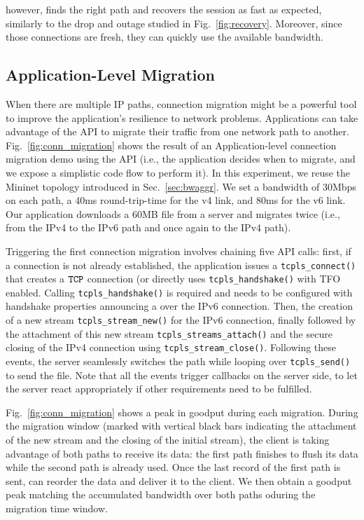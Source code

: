 \tcpls however, finds the right path and recovers the session as fast as
expected, similarly to the drop and \rst outage studied in Fig.~\ref{fig:recovery}. Moreover, since those connections are fresh, they can quickly use the available bandwidth.

\subsection{Application-Level Migration}

When there are multiple IP paths, connection migration might be a
powerful tool to improve the application's resilience to network problems. Applications can take advantage of the \tcpls API to migrate their traffic from one network path to another. Fig.~\ref{fig:conn_migration} shows the result of an Application-level connection migration demo using the API (i.e., the application decides when to migrate, and we expose a simplistic code flow to perform it). In this experiment, we reuse the Mininet topology introduced in Sec.~\ref{sec:bwaggr}. We set a bandwidth of 30Mbps on each path, a 40ms round-trip-time for the v4 link, and 80ms for the v6 link. Our application downloads
a 60MB file from a server and migrates twice (i.e., from the IPv4 to the IPv6 path and once again to the IPv4 path).

Triggering the first connection migration involves chaining five API calls: first, if a \tcp connection is not already established, the application issues a
\texttt{tcpls\_connect()} that creates a $\texttt{TCP}$ connection (or directly uses
\texttt{tcpls\_handshake()} with TFO enabled. Calling \texttt{tcpls\_handshake()} is required and needs to be configured with handshake properties announcing a \join over the IPv6 connection. Then, the creation of a new stream \texttt{tcpls\_stream\_new()} for the IPv6 connection, finally followed by the attachment of this new stream \texttt{tcpls\_streams\_attach()} and the secure closing of the IPv4 \tcp connection using \texttt{tcpls\_stream\_close()}. Following these events, the server seamlessly switches the path while looping over \texttt{tcpls\_send()} to send the file. Note that all the events trigger callbacks on the server side, to let the server react appropriately if other requirements need to be fulfilled.

Fig.~\ref{fig:conn_migration} shows a peak in goodput during each migration. During the migration window (marked with vertical black bars indicating the attachment of the new stream and the closing of the initial stream), the client is taking advantage of both paths to receive its data: the first path finishes to flush its data while the second path is already used. Once the last record of the first path is sent, \tcpls can reorder the data and deliver it to the client. We then obtain a goodput peak matching the accumulated bandwidth over both paths oduring the migration time window.


